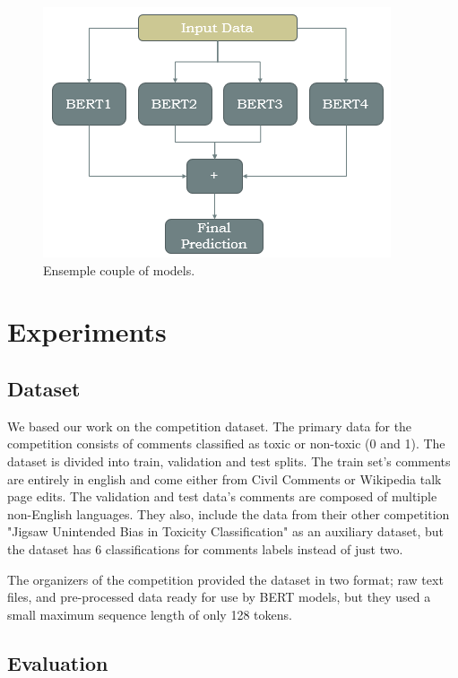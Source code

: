\documentclass[10pt,twocolumn,letterpaper]{article}
\begin{document}
\begin{figure}[htbp]
\centerline{\includegraphics[width=0.999\columnwidth]{Figures/EnsempleCoupleOfModels.png}}
\caption{Ensemple couple of models.}
\label{EnsempleCoupleOfModels}
\end{figure}


\section{Experiments}

\subsection{Dataset}
We based our work on the competition dataset. The primary data for the competition consists of comments classified as toxic or non-toxic (0 and 1). The dataset is divided into train, validation and test splits. The train set’s comments are entirely in english and come either from Civil Comments or Wikipedia talk page edits. The validation and test data's comments are composed of multiple non-English languages\cite{Jigsaw}. They also, include the data from their other competition "Jigsaw Unintended Bias in Toxicity Classification"\cite{Jigsaw2} as an auxiliary dataset, but the dataset has 6 classifications for comments labels instead of just two.

The organizers of the competition provided the dataset in two format; raw text files, and pre-processed data ready for use by BERT models, but they used a small maximum sequence length of only 128 tokens. 

\subsection{Evaluation}
\end{document}
